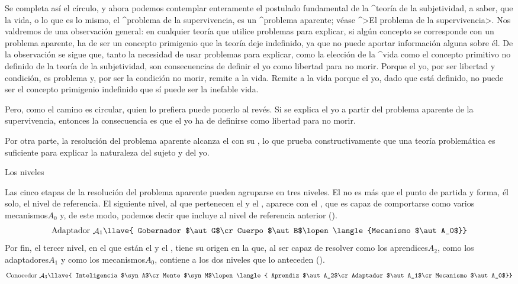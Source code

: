 Se completa así el círculo, y ahora podemos contemplar enteramente el
postulado fundamental de la ^{teoría de la subjetividad}, a saber, que
la vida, o lo que es lo mismo, el ^{problema de la supervivencia}, es un
^{problema aparente}; véase ^>El problema de la supervivencia>. Nos
valdremos de una observación general: en cualquier teoría que utilice
problemas para explicar, si algún concepto se corresponde con un
problema aparente, ha de ser un concepto primigenio que la teoría deje
indefinido, ya que no puede aportar información alguna sobre él. De la
observación se sigue que, tanto la necesidad de usar problemas para
explicar, como la elección de la ^{vida} como el concepto primitivo no
definido de la teoría de la subjetividad, son consecuencias de definir
el yo como libertad para no morir. Porque el yo, por ser libertad y
condición, es problema y, por ser la condición no morir, remite a la
vida. Remite a la vida porque el yo, dado que está definido, no puede
ser el concepto primigenio indefinido que sí puede ser la inefable vida.

Pero, como el camino es circular, quien lo prefiera puede ponerlo al
revés. Si se explica el yo a partir del problema aparente de la
supervivencia, entonces la consecuencia es que el yo ha de definirse
como libertad para no morir.

Por otra parte, la resolución del problema aparente alcanza el {\sujeto}
con su {\yo}, lo que prueba constructivamente que una teoría
problemática es suficiente para explicar la naturaleza del sujeto y del
yo.


\Section Los niveles

Las cinco etapas de la resolución del problema aparente pueden agruparse
en tres niveles. El {\mecanismo} no es más que el punto de partida y
forma, él solo, el nivel de referencia. El siguiente nivel, al que
pertenecen el {\adaptador} y el {\aprendiz}, aparece con el {\cuerpo},
que es capaz de comportarse como varios \corporal mecanismos$A_0$ y, de
este modo, podemos decir que incluye al nivel de referencia anterior
().
$$\hbox{Adaptador $\aut A_1$}\llave{
   Gobernador $\aut G$\cr
   Cuerpo $\aut B$\lopen\langle{Mecanismo $\aut A_0$}}$$
Por fin, el tercer nivel, en el que están el {\conocedor} y el
{\sujeto}, tiene su origen en la {\mente} que, al ser capaz de resolver
como los \corporal aprendices$A_2$, como los \corporal adaptadores$A_1$
y como los \corporal mecanismos$A_0$, contiene a los dos niveles que lo
anteceden ().
$$\hbox{Conocedor $\aut A_3$}\llave{
   Inteligencia $\syn A$\cr
   Mente $\syn M$\lopen\langle{
    Aprendiz $\aut A_2$\cr
    Adaptador $\aut A_1$\cr
    Mecanismo $\aut A_0$}}$$

